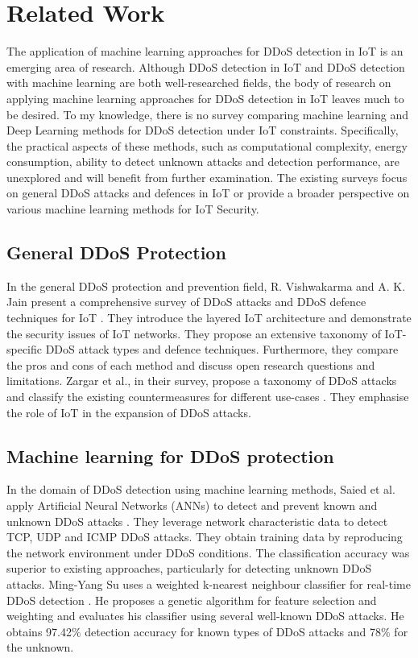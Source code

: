\documentclass[conference, 11pt]{IEEEtran}
\begin{document}
    \section{Related Work}
    The application of machine learning approaches for DDoS detection in IoT is an emerging area of research.
    Although DDoS detection in IoT and DDoS detection with machine learning are both well-researched fields, the body of research on applying machine learning approaches for DDoS detection in IoT leaves much to be desired.
    To my knowledge, there is no survey comparing machine learning and Deep Learning methods for DDoS detection under IoT constraints.
    Specifically, the practical aspects of these methods, such as computational complexity, energy consumption, ability to detect unknown attacks and detection performance, are unexplored and will benefit from further examination.
    The existing surveys focus on general DDoS attacks and defences in IoT or provide a broader perspective on various machine learning methods for IoT Security.

    \subsection{General DDoS Protection}
    In the general DDoS protection and prevention field, R. Vishwakarma and A. K. Jain present a comprehensive survey of DDoS attacks and DDoS defence techniques for IoT \cite{article:14}.
    They introduce the layered IoT architecture and demonstrate the security issues of IoT networks.
    They propose an extensive taxonomy of IoT-specific DDoS attack types and defence techniques.
    Furthermore, they compare the pros and cons of each method and discuss open research questions and limitations.
    Zargar et al., in their survey, propose a taxonomy of DDoS attacks and classify the existing countermeasures for different use-cases \cite{zargar2013survey}.
    They emphasise the role of IoT in the expansion of DDoS attacks.

    \subsection{Machine learning for DDoS protection}
    In the domain of DDoS detection using machine learning methods, Saied et al. apply Artificial Neural Networks (ANNs) to detect and prevent known and unknown DDoS attacks \cite{article:13}.
    They leverage network characteristic data to detect TCP, UDP and ICMP DDoS attacks.
    They obtain training data by reproducing the network environment under DDoS conditions.
    The classification accuracy was superior to existing approaches, particularly for detecting unknown DDoS attacks.
    Ming-Yang Su uses a weighted k-nearest neighbour classifier for real-time DDoS detection \cite{article:2}.
    He proposes a genetic algorithm for feature selection and weighting and evaluates his classifier using several well-known DDoS attacks.
    He obtains 97.42\% detection accuracy for known types of DDoS attacks and 78\% for the unknown.
\end{document}
